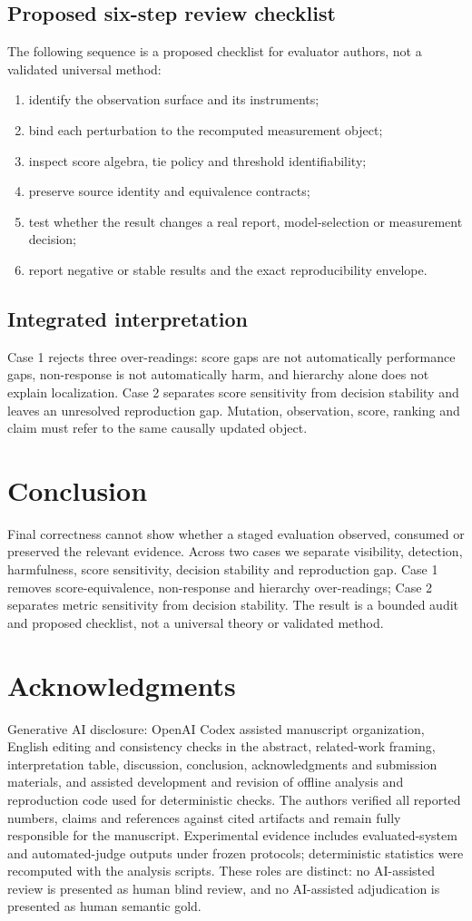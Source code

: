 \documentclass[10pt]{article}
\begin{document}
\subsection{Proposed six-step review checklist}
The following sequence is a proposed checklist for evaluator authors, not a validated universal method:
\begin{enumerate}
\item identify the observation surface and its instruments;
\item bind each perturbation to the recomputed measurement object;
\item inspect score algebra, tie policy and threshold identifiability;
\item preserve source identity and equivalence contracts;
\item test whether the result changes a real report, model-selection or measurement decision;
\item report negative or stable results and the exact reproducibility envelope.
\end{enumerate}
\subsection{Integrated interpretation}
Case 1 rejects three over-readings: score gaps are not automatically performance gaps, non-response is not automatically harm, and hierarchy alone does not explain localization. Case 2 separates score sensitivity from decision stability and leaves an unresolved reproduction gap. Mutation, observation, score, ranking and claim must refer to the same causally updated object.
\section{Conclusion}
Final correctness cannot show whether a staged evaluation observed, consumed or preserved the relevant evidence. Across two cases we separate visibility, detection, harmfulness, score sensitivity, decision stability and reproduction gap. Case 1 removes score-equivalence, non-response and hierarchy over-readings; Case 2 separates metric sensitivity from decision stability. The result is a bounded audit and proposed checklist, not a universal theory or validated method.
\section{Acknowledgments}
Generative AI disclosure: OpenAI Codex \cite{openai2026codex} assisted manuscript organization,
English editing and consistency checks in the abstract, related-work framing,
interpretation table, discussion, conclusion, acknowledgments and submission
materials, and assisted development and revision of offline analysis and
reproduction code used for deterministic checks. The authors verified all
reported numbers, claims and references against cited artifacts and remain
fully responsible for the manuscript. Experimental evidence includes
evaluated-system and automated-judge outputs under frozen protocols;
deterministic statistics were recomputed with the analysis scripts. These roles
are distinct: no AI-assisted review is presented as human blind review, and no
AI-assisted adjudication is presented as human semantic gold.
\end{document}
